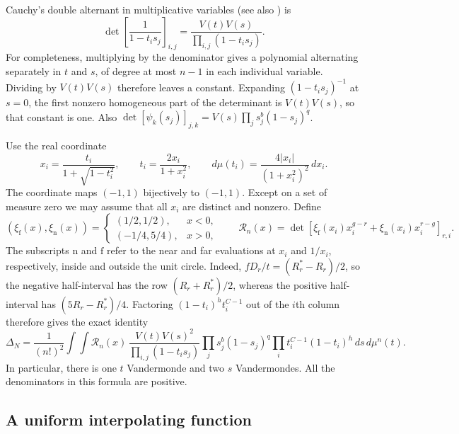 Cauchy's double alternant in multiplicative variables
\cite{Cauchy1841} (see also \cite[Section~2.1, Equation~(2.7)]{Krattenthaler1999}) is
\begin{equation}\label{eq:real-cauchy-determinant}
 \det\left[\frac1{1-t_i s_j}\right]_{i,j}
 =\frac{V(t)V(s)}{\prod_{i,j}(1-t_i s_j)}.
\end{equation}
For completeness, multiplying by the denominator gives a polynomial
alternating separately in $t$ and $s$, of degree at most $n-1$ in each
individual variable.  Dividing by $V(t)V(s)$ therefore leaves a constant.
Expanding $(1-t_i s_j)^{-1}$ at $s=0$, the first nonzero homogeneous
part of the determinant is $V(t)V(s)$, so that constant is one.  Also
$\det[\psi_k(s_j)]_{j,k}=V(s)\prod_j s_j^b(1-s_j)^q$.

Use the real coordinate
\begin{equation}\label{eq:real-coordinate}
 x_i=\frac{t_i}{1+\sqrt{1-t_i^2}},\qquad
 t_i=\frac{2x_i}{1+x_i^2},\qquad
 d\mu(t_i)=\frac{4|x_i|}{(1+x_i^2)^2}\,dx_i.
\end{equation}
The coordinate maps $(-1,1)$ bijectively to $(-1,1)$.  Except on a
set of measure zero we may assume that all $x_i$ are distinct and
nonzero.  Define
\[
 (\xi_{\mathrm f}(x),\xi_{\mathrm n}(x))=
 \begin{cases}(1/2,1/2),&x<0,\\(-1/4,5/4),&x>0,\end{cases}
 \qquad
 \mathcal R_n(x)=
 \det\left[\xi_{\mathrm f}(x_i)x_i^{g-r}
             +\xi_{\mathrm n}(x_i)x_i^{r-g}\right]_{r,i}.
\]
The subscripts $\mathrm n$ and $\mathrm f$ refer to the near and far
evaluations at $x_i$ and $1/x_i$, respectively, inside and outside the
unit circle.
Indeed, $fD_r/t=(R_r^*-R_r)/2$, so the negative half-interval
has the row $(R_r+R_r^*)/2$, whereas the positive half-interval has
$(5R_r-R_r^*)/4$.  Factoring $(1-t_i)^ht_i^{C-1}$ out of the
$i$th column therefore gives the exact identity
\begin{equation}\label{eq:real-sheet-integral}
 \Delta_N=\frac1{(n!)^2}\int\!\int
 \mathcal R_n(x)\,
 \frac{V(t)V(s)^2}{\prod_{i,j}(1-t_i s_j)}
 \prod_j s_j^b(1-s_j)^q
 \prod_i t_i^{C-1}(1-t_i)^h\,ds\,d\mu^n(t).
\end{equation}
In particular, there is one $t$ Vandermonde and two $s$
Vandermondes.  All the denominators in this formula are positive.

\subsection{A uniform interpolating function}

